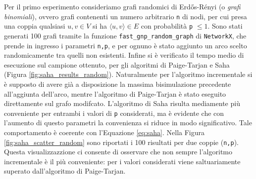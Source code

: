 Per il primo esperimento consideriamo grafi randomici di Erdős-Rényi (o \emph{grafi binomiali}), ovvero grafi contenenti un numero arbitrario \verb|n| di nodi, per cui presa una coppia qualsiasi $u,v \in V$ si ha $\langle u,v\rangle \in E$ con probabilità \verb|p| $\leq 1$. Sono stati generati 100 grafi tramite la funzione \verb|fast_gnp_random_graph| di \texttt{NetworkX}, che prende in ingresso i parametri \texttt{n,p}, e per ognuno è stato aggiunto un arco scelto randomicamente tra quelli non esistenti. Infine si è verificato il tempo medio di esecuzione sul campione ottenuto, per gli algoritmi di Paige-Tarjan e Saha (Figura \ref{fig:saha_results_random}). Naturalmente per l'algoritmo incrementale si è supposto di avere già a disposizione la massima bisimulazione precedente all'aggiunta dell'arco, mentre l'algoritmo di Paige-Tarjan è stato eseguito direttamente sul grafo modifcato. L'algoritmo di Saha risulta mediamente più conveniente per entrambi i valori di \texttt{p} considerati, ma è evidente che con l'aumento di questo parametri la convenienza si riduce in modo significativo. Tale comportamento è coerente con l'Equazione \eqref{eq:saha}. Nella Figura \ref{fig:saha_scatter_random} sono riportati i 100 risultati per due coppie (\texttt{n,p}). Questa visualizzazzione ci consente di osservare che non sempre l'algoritmo incrementale è il più conveniente: per i valori considerati viene saltuariamente superato dall'algoritmo di Paige-Tarjan.


